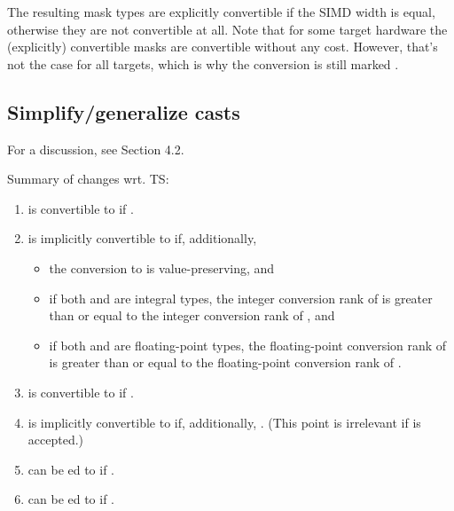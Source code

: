 The resulting mask types are explicitly convertible if the SIMD width is equal,
otherwise they are not convertible at all.
Note that for some target hardware the (explicitly) convertible masks are
convertible without any cost.
However, that's not the case for all targets, which is why the conversion is
still marked .

\subsection{Simplify/generalize casts}\label{sec:casts}

For a discussion, see  Section 4.2.

Summary of changes wrt. TS:
\begin{enumerate}
  \item {} is convertible to  if
    .

  \item {} is implicitly convertible to 
    if, additionally,
    \begin{itemize}
      \item the conversion  to  is value-preserving, and
      \item if both  and  are integral types, the integer
        conversion rank of  is greater than or equal to the integer
        conversion rank of , and
      \item if both  and  are floating-point types, the
        floating-point conversion rank of  is greater than or equal to
        the floating-point conversion rank of .
    \end{itemize}


  \item {} is convertible to  if
    .

  \item {} is implicitly convertible to
     if, additionally, .
    (This point is irrelevant if  is accepted.)

  \item {} can be ed to  if
    .

  \item {} can be ed to  if
    .
\end{enumerate}

